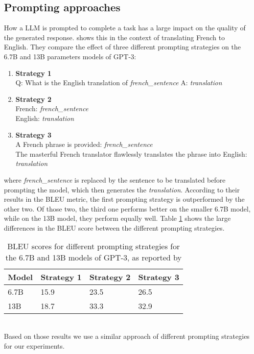 \subsection{Prompting approaches}
How a LLM is prompted to complete a task has a large impact on the quality of the generated response.
\cite{reynolds:2021} shows this in the context of translating French to English.
They compare the effect of three different prompting strategies on the 6.7B and 13B parameters models of GPT-3:
\begin{enumerate}
    \item \textbf{Strategy 1}\\Q: What is the English translation of \textit{french\_sentence} A: \textit{translation}
    \item \textbf{Strategy 2}\\French: \textit{french\_sentence}\\English: \textit{translation}
    \item \textbf{Strategy 3}\\A French phrase is provided: \textit{french\_sentence}\\
    The masterful French translator flawlessly translates the phrase
into English: \textit{translation}
\end{enumerate}
where \textit{french\_sentence} is replaced by the sentence to be translated before prompting the model, which then generates the \textit{translation}.
According to their results in the BLEU metric, the first prompting strategy is outperformed by the other two.
Of those two, the third one performs better on the smaller 6.7B model, while on the 13B model, they perform equally well.
Table \ref{tab:fr-en-prompting} shows the large differences in the BLEU score between the different prompting strategies.
\begin{table}[tb]
\centering
\begin{tabularx}{\textwidth}{lXXX}
\hline
\textbf{Model} & \textbf{Strategy 1} & \textbf{Strategy 2} & \textbf{Strategy 3} \\
\hline
6.7B & 15.9 & 23.5 & 26.5 \\
13B & 18.7 & 33.3 & 32.9 \\
\hline
\end{tabularx}
\caption{BLEU scores for different prompting strategies for the 6.7B and 13B models of GPT-3, as reported by \cite{reynolds:2021}}\label{tab:fr-en-prompting}
\end{table}
\\
Based on those results we use a similar approach of different prompting strategies for our experiments.
